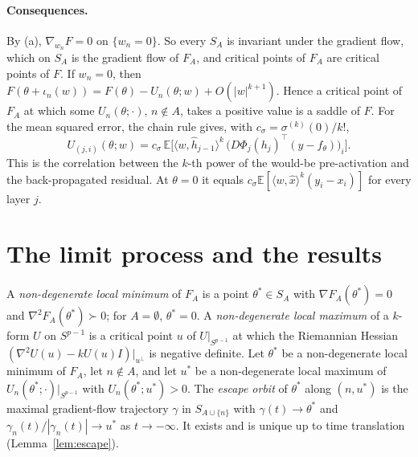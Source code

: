 \documentclass[11pt]{article}
\theoremstyle{definition}
\theoremstyle{remark}
\newcommand{\E}{\mathbb{E}}
\newcommand{\ip}[2]{\langle #1,#2\rangle}
\begin{document}
\paragraph{Consequences.} By (a), $\nabla_{w_n}F=0$ on $\{w_n=0\}$. So every $S_A$ is invariant under the gradient flow, which on $S_A$ is the gradient flow of $F_A$, and critical points of $F_A$ are critical points of $F$. If $w_n=0$, then $F(\theta+\iota_n(w))=F(\theta)-U_n(\theta;w)+O(|w|^{k+1})$. Hence a critical point of $F_A$ at which some $U_n(\theta;\cdot)$, $n\notin A$, takes a positive value is a saddle of $F$. For the mean squared error, the chain rule gives, with $c_\sigma=\sigma^{(k)}(0)/k!$,
\[
U_{(j,i)}(\theta;w)=c_\sigma\,\E\big[\ip{w}{\hat h_{j-1}}^k\,\big(D\Phi_j(h_j)^\top(y-f_\theta)\big)_i\big].
\]
This is the correlation between the $k$-th power of the would-be pre-activation and the back-propagated residual. At $\theta=0$ it equals $c_\sigma\E[\ip{w}{\hat x}^k(y_i-x_i)]$ for every layer $j$.

\section{The limit process and the results}

A \emph{non-degenerate local minimum} of $F_A$ is a point $\theta^*\in S_A$ with $\nabla F_A(\theta^*)=0$ and $\nabla^2F_A(\theta^*)\succ0$; for $A=\emptyset$, $\theta^*=0$. A \emph{non-degenerate local maximum} of a $k$-form $U$ on $S^{p-1}$ is a critical point $u$ of $U|_{S^{p-1}}$ at which the Riemannian Hessian $(\nabla^2U(u)-kU(u)I)|_{u^\perp}$ is negative definite. Let $\theta^*$ be a non-degenerate local minimum of $F_A$, let $n\notin A$, and let $u^*$ be a non-degenerate local maximum of $U_n(\theta^*;\cdot)|_{S^{p-1}}$ with $U_n(\theta^*;u^*)>0$. The \emph{escape orbit} of $\theta^*$ along $(n,u^*)$ is the maximal gradient-flow trajectory $\gamma$ in $S_{A\cup\{n\}}$ with $\gamma(t)\to\theta^*$ and $\gamma_n(t)/|\gamma_n(t)|\to u^*$ as $t\to-\infty$. It exists and is unique up to time translation (Lemma~\ref{lem:escape}).
\end{document}
